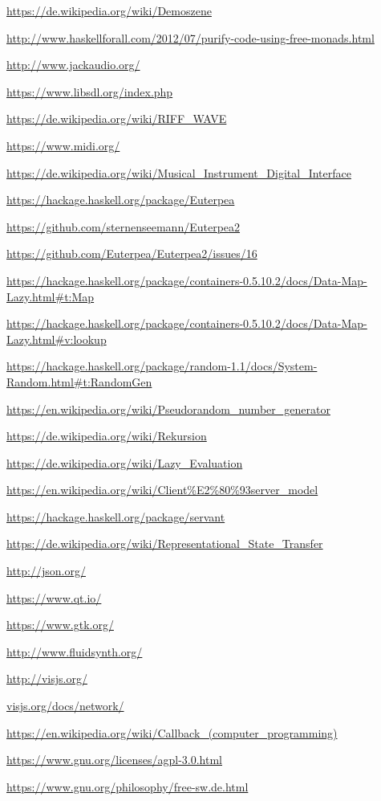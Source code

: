 \documentclass[a4paper,twocolumn]{article}
\begin{document}
\begin{thebibliography}{9}
  \url{https://de.wikipedia.org/wiki/Demoszene}

  \url{http://www.haskellforall.com/2012/07/purify-code-using-free-monads.html}

  \url{http://www.jackaudio.org/}

  \url{https://www.libsdl.org/index.php}

  \url{https://de.wikipedia.org/wiki/RIFF_WAVE}

  \url{https://www.midi.org/}

  \url{https://de.wikipedia.org/wiki/Musical_Instrument_Digital_Interface}

  \url{https://hackage.haskell.org/package/Euterpea}

  \url{https://github.com/sternenseemann/Euterpea2}

  \url{https://github.com/Euterpea/Euterpea2/issues/16}

  \url{https://hackage.haskell.org/package/containers-0.5.10.2/docs/Data-Map-Lazy.html#t:Map}

  \url{https://hackage.haskell.org/package/containers-0.5.10.2/docs/Data-Map-Lazy.html#v:lookup}

  \url{https://hackage.haskell.org/package/random-1.1/docs/System-Random.html#t:RandomGen}

  \url{https://en.wikipedia.org/wiki/Pseudorandom_number_generator}

  \url{https://de.wikipedia.org/wiki/Rekursion}

  \url{https://de.wikipedia.org/wiki/Lazy_Evaluation}

  \url{https://en.wikipedia.org/wiki/Client%E2%80%93server_model}

  \url{https://hackage.haskell.org/package/servant}

  \url{https://de.wikipedia.org/wiki/Representational_State_Transfer}

  \url{http://json.org/}

  \url{https://www.qt.io/}

  \url{https://www.gtk.org/}

  \url{http://www.fluidsynth.org/}

  \url{http://visjs.org/}

  \url{visjs.org/docs/network/}

  \url{https://en.wikipedia.org/wiki/Callback_(computer_programming)}

  \url{https://www.gnu.org/licenses/agpl-3.0.html}

  \url{https://www.gnu.org/philosophy/free-sw.de.html}
\end{thebibliography}
\end{document}
